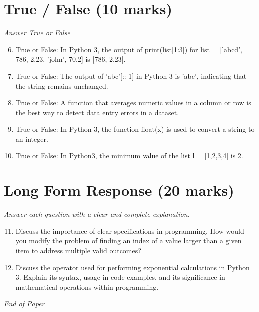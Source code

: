 \documentclass[12pt]{article}
\begin{document}
\section*{True / False (10 marks)}
\textit{Answer True or False}
\begin{enumerate}[label=\arabic*.]
\setcounter{enumi}{5}
\item True or False: In Python 3, the output of print(list[1:3]) for list = ['abcd', 786, 2.23, 'john', 70.2] is [786, 2.23].
\item True or False: The output of 'abc'[::-1] in Python 3 is 'abc', indicating that the string remains unchanged.
\item True or False: A function that averages numeric values in a column or row is the best way to detect data entry errors in a dataset.
\item True or False: In Python 3, the function float(x) is used to convert a string to an integer.
\item True or False: In Python3, the minimum value of the list l = [1,2,3,4] is 2.
\end{enumerate}

\section*{Long Form Response (20 marks)}
\textit{Answer each question with a clear and complete explanation.}
\begin{enumerate}[label=\arabic*.]
\setcounter{enumi}{10}
\item Discuss the importance of clear specifications in programming. How would you modify the
problem of finding an index of a value larger than a given item to address multiple valid
outcomes?
\item Discuss the operator used for performing exponential calculations in Python 3. Explain its
syntax, usage in code examples, and its significance in mathematical operations within
programming.
\end{enumerate}

\vfill
\noindent\textit{End of Paper}
\end{document}
